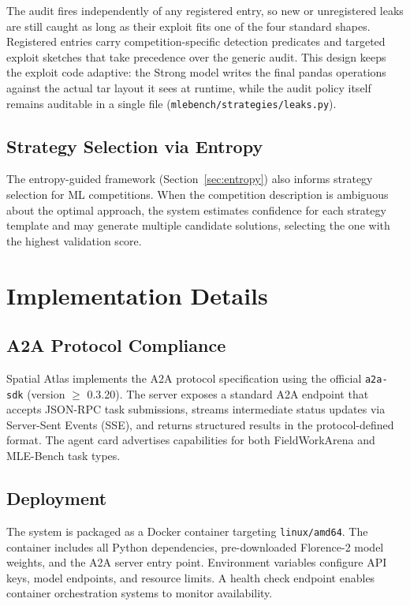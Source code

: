 \documentclass[11pt]{article}
\begin{document}
The audit fires independently of any registered entry, so new or unregistered leaks are still caught as long as their exploit fits one of the four standard shapes. Registered entries carry competition-specific detection predicates and targeted exploit sketches that take precedence over the generic audit. This design keeps the exploit code adaptive: the Strong model writes the final pandas operations against the actual tar layout it sees at runtime, while the audit policy itself remains auditable in a single file (\texttt{mlebench/strategies/leaks.py}).

\subsection{Strategy Selection via Entropy}

The entropy-guided framework (Section~\ref{sec:entropy}) also informs strategy selection for ML competitions. When the competition description is ambiguous about the optimal approach, the system estimates confidence for each strategy template and may generate multiple candidate solutions, selecting the one with the highest validation score.

\section{Implementation Details}
\label{sec:implementation}

\subsection{A2A Protocol Compliance}

Spatial Atlas implements the A2A protocol specification using the official \texttt{a2a-sdk} (version $\geq$ 0.3.20). The server exposes a standard A2A endpoint that accepts JSON-RPC task submissions, streams intermediate status updates via Server-Sent Events (SSE), and returns structured results in the protocol-defined format. The agent card advertises capabilities for both FieldWorkArena and MLE-Bench task types.

\subsection{Deployment}

The system is packaged as a Docker container targeting \texttt{linux/amd64}. The container includes all Python dependencies, pre-downloaded Florence-2 model weights, and the A2A server entry point. Environment variables configure API keys, model endpoints, and resource limits. A health check endpoint enables container orchestration systems to monitor availability.
\end{document}
